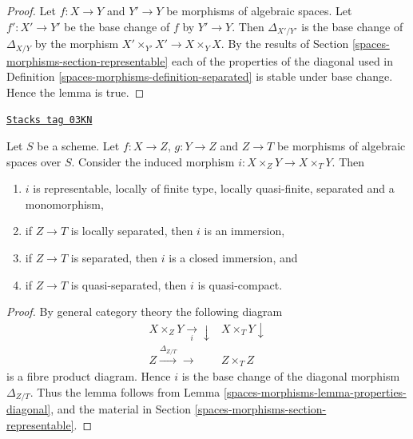 \begin{proof}
Let $f : X \to Y$ and $Y' \to Y$ be morphisms of algebraic spaces.
Let $f' : X' \to Y'$ be the base change of $f$ by $Y' \to Y$. Then
$\Delta_{X'/Y'}$ is the base change of $\Delta_{X/Y}$ by
the morphism $X' \times_{Y'} X' \to X \times_Y X$. By the results of
Section \ref{spaces-morphisms-section-representable}
each of the properties of the diagonal used in
Definition \ref{spaces-morphisms-definition-separated}
is stable under base change. Hence the lemma is true.
\end{proof}

\begin{lemma}
\label{spaces-morphisms-lemma-fibre-product-after-map}
\href{https://stacks.math.columbia.edu/tag/03KN}{\texttt{Stacks tag 03KN}}


Let $S$ be a scheme. Let $f : X \to Z$, $g : Y \to Z$ and $Z \to T$
be morphisms of algebraic spaces over $S$. Consider the induced morphism
$i : X \times_Z Y \to X \times_T Y$. Then
\begin{enumerate}
\item $i$ is representable, locally of finite type, locally quasi-finite,
separated and a monomorphism,
\item if $Z \to T$ is locally separated, then $i$ is an immersion,
\item if $Z \to T$ is separated, then $i$ is a closed immersion, and
\item if $Z \to T$ is quasi-separated, then $i$ is quasi-compact.
\end{enumerate}
\end{lemma}

\begin{proof}
By general category theory the following diagram
$$
\begin{array}{cc}X \times_Z Y \underset{i}{\longrightarrow}\downarrow & X \times_T Y \downarrow \\ Z \overset{\Delta_{Z/T}}{\longrightarrow}\longrightarrow & Z \times_T Z\end{array}
$$
is a fibre product diagram. Hence $i$ is the base change of the
diagonal morphism $\Delta_{Z/T}$. Thus the lemma follows
from Lemma \ref{spaces-morphisms-lemma-properties-diagonal}, and the material in
Section \ref{spaces-morphisms-section-representable}.
\end{proof}

